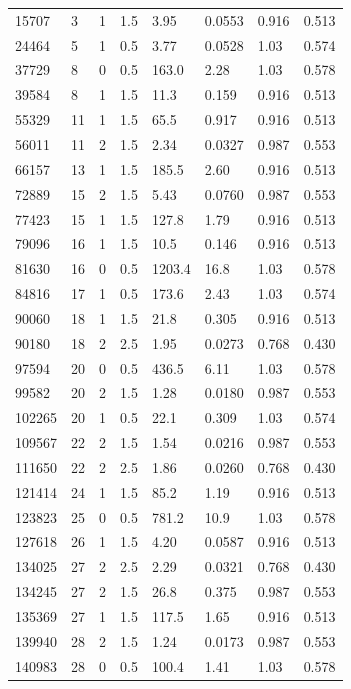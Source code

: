 \documentclass[preview]{standalone}
\begin{document}
{{\begin{tabular}{L{1.2cm}C{1.2cm} C{0.3cm}C{0.5cm} C{1.4cm}C{1.4cm} C{1.4cm}C{1.4cm}}
  15707  &     3  & 1     & 1.5 &  3.95  & 0.0553  & 0.916 &  0.513   \\ 
  24464  &     5  & 1     & 0.5 &  3.77  & 0.0528  & 1.03 &  0.574   \\ 
  37729  &     8  & 0     & 0.5 &  163.0  & 2.28  & 1.03 &  0.578   \\ 
  39584  &     8  & 1     & 1.5 &  11.3  & 0.159  & 0.916 &  0.513   \\ 
  55329  &    11  & 1     & 1.5 &  65.5  & 0.917  & 0.916 &  0.513   \\ 
  56011  &    11  & 2     & 1.5 &  2.34  & 0.0327  & 0.987 &  0.553   \\ 
  66157  &    13  & 1     & 1.5 &  185.5  & 2.60  & 0.916 &  0.513   \\ 
  72889  &    15  & 2     & 1.5 &  5.43  & 0.0760  & 0.987 &  0.553   \\ 
  77423  &    15  & 1     & 1.5 &  127.8  & 1.79  & 0.916 &  0.513   \\ 
  79096  &    16  & 1     & 1.5 &  10.5  & 0.146  & 0.916 &  0.513   \\ 
  81630  &    16  & 0     & 0.5 &  1203.4  & 16.8  & 1.03 &  0.578   \\ 
  84816  &    17  & 1     & 0.5 &  173.6  & 2.43  & 1.03 &  0.574   \\ 
  90060  &    18  & 1     & 1.5 &  21.8  & 0.305  & 0.916 &  0.513   \\ 
  90180  &    18  & 2     & 2.5 &  1.95  & 0.0273  & 0.768 &  0.430   \\ 
  97594  &    20  & 0     & 0.5 &  436.5  & 6.11  & 1.03 &  0.578   \\ 
  99582  &    20  & 2     & 1.5 &  1.28  & 0.0180  & 0.987 &  0.553   \\ 
  102265  &    20  & 1     & 0.5 &  22.1  & 0.309  & 1.03 &  0.574   \\ 
  109567  &    22  & 2     & 1.5 &  1.54  & 0.0216  & 0.987 &  0.553   \\ 
  111650  &    22  & 2     & 2.5 &  1.86  & 0.0260  & 0.768 &  0.430   \\ 
  121414  &    24  & 1     & 1.5 &  85.2  & 1.19  & 0.916 &  0.513   \\ 
  123823  &    25  & 0     & 0.5 &  781.2  & 10.9  & 1.03 &  0.578   \\ 
  127618  &    26  & 1     & 1.5 &  4.20  & 0.0587  & 0.916 &  0.513   \\ 
  134025  &    27  & 2     & 2.5 &  2.29  & 0.0321  & 0.768 &  0.430   \\ 
  134245  &    27  & 2     & 1.5 &  26.8  & 0.375  & 0.987 &  0.553   \\ 
  135369  &    27  & 1     & 1.5 &  117.5  & 1.65  & 0.916 &  0.513   \\ 
  139940  &    28  & 2     & 1.5 &  1.24  & 0.0173  & 0.987 &  0.553   \\ 
  140983  &    28  & 0     & 0.5 &  100.4  & 1.41  & 1.03 &  0.578   \\ 
\hline 
\end{tabular} 

}}
\end{document}
